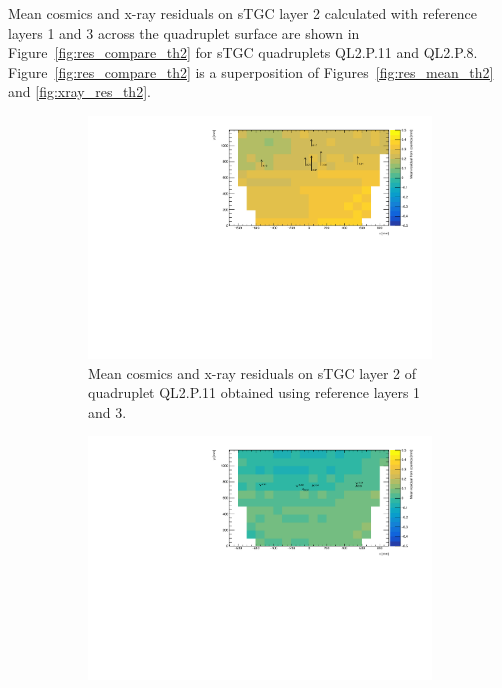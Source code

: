 Mean cosmics and x-ray residuals on sTGC layer 2 calculated with reference layers 1 and 3 across the quadruplet surface are shown in Figure~\ref{fig:res_compare_th2} for sTGC quadruplets QL2.P.11 and QL2.P.8. Figure~\ref{fig:res_compare_th2} is a superposition of Figures~\ref{fig:res_mean_th2} and \ref{fig:xray_res_th2}.

\newpage
\thispagestyle{empty}
\begin{figure}
\centering
\begin{subfigure}{\textwidth}
  \centering
  \includegraphics[width=\linewidth]{figures/QL2P11_compare_residuals_th2_layer2_fixedlayers13.pdf}
  \caption{Mean cosmics and x-ray residuals on sTGC layer 2 of quadruplet QL2.P.11 obtained using reference layers 1 and 3.}
  \label{fig:res_compare_th2_ql2p11}
\end{subfigure}%
\vspace*{\floatsep}
\begin{subfigure}{\textwidth}
  \centering
  \includegraphics[width=\linewidth]{figures/QL2P08_compare_residuals_th2_layer2_fixedlayers13.pdf}

\end{subfigure}
\end{figure}
